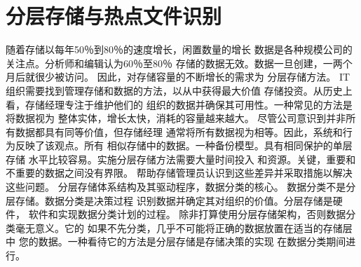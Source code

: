 \chapter{分层存储与热点文件识别}
随着存储以每年50％到80％的速度增长，闲置数量的增长
数据是各种规模公司的关注点。分析师和编辑认为60％至80％
存储的数据无效。数据一旦创建，一两个月后就很少被访问。
因此，对存储容量的不断增长的需求为
分层存储方法。
IT组织需要找到管理存储和数据的方法，以从中获得最大价值
存储投资。从历史上看，存储经理专注于维护他们的
组织的数据并确保其可用性。一种常见的方法是将数据视为
整体实体，增长太快，消耗的容量越来越大。
尽管公司意识到并非所有数据都具有同等价值，但存储经理
通常将所有数据视为相等。因此，系统和行为反映了该观点。所有
相似存储中的数据。一种备份模型。具有相同保护的单层存储
水平比较容易。实施分层存储方法需要大量时间投入
和资源。关键，重要和不重要的数据之间没有界限。
帮助存储管理员认识到这些差异并采取措施以解决这些问题。
分层存储体系结构及其驱动程序，数据分类的核心。
数据分类不是分层存储。数据分类是决策过程
识别数据并确定其对组织的价值。分层存储是硬件，
软件和实现数据分类计划的过程。
除非打算使用分层存储架构，否则数据分类毫无意义。它的
如果不先分类，几乎不可能将正确的数据放置在适当的存储层中
您的数据。一种看待它的方法是分层存储是存储决策的实现
在数据分类期间进行。
